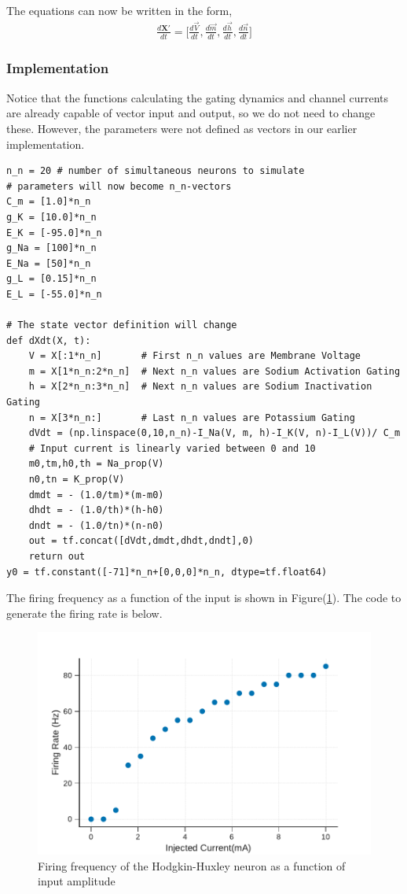 \documentclass[10pt,letterpaper]{article}
\begin{document}
The equations can now be written in the form,
\begin{eqnarray}\frac{d\mathbf{X'}}{dt}= \Big[\frac{d\vec{V}}{dt},\frac{d\vec{m}}{dt},\frac{d\vec{h}}{dt},\frac{d\vec{n}}{dt}\Big]\end{eqnarray}

\subsubsection*{Implementation}

Notice that the functions calculating the gating dynamics and channel currents are already capable of vector input and output, so we do not need to change these. However, the parameters were not defined as vectors in our earlier implementation.

\begin{verbatim}
n_n = 20 # number of simultaneous neurons to simulate
# parameters will now become n_n-vectors
C_m = [1.0]*n_n
g_K = [10.0]*n_n
E_K = [-95.0]*n_n
g_Na = [100]*n_n
E_Na = [50]*n_n 
g_L = [0.15]*n_n
E_L = [-55.0]*n_n

# The state vector definition will change
def dXdt(X, t):
    V = X[:1*n_n]       # First n_n values are Membrane Voltage
    m = X[1*n_n:2*n_n]  # Next n_n values are Sodium Activation Gating
    h = X[2*n_n:3*n_n]  # Next n_n values are Sodium Inactivation Gating
    n = X[3*n_n:]       # Last n_n values are Potassium Gating
    dVdt = (np.linspace(0,10,n_n)-I_Na(V, m, h)-I_K(V, n)-I_L(V))/ C_m 
    # Input current is linearly varied between 0 and 10
    m0,tm,h0,th = Na_prop(V)
    n0,tn = K_prop(V)
    dmdt = - (1.0/tm)*(m-m0)
    dhdt = - (1.0/th)*(h-h0)
    dndt = - (1.0/tn)*(n-n0)
    out = tf.concat([dVdt,dmdt,dhdt,dndt],0)
    return out
y0 = tf.constant([-71]*n_n+[0,0,0]*n_n, dtype=tf.float64)
\end{verbatim}
The firing frequency as a function of the input is shown in Figure(\ref{fig:freq}). The code to generate the firing rate is below.
\begin{center}
\begin{figure}
\includegraphics[scale=0.6]{fig12.pdf} 
\caption{ Firing frequency of the Hodgkin-Huxley neuron as a function of input amplitude}
\label{fig:freq}
\end{figure}
\end{center}
\end{document}
